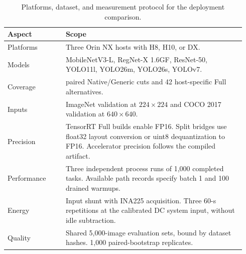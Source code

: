 \begin{table}[t]
\centering\small
\caption{Platforms, dataset, and measurement protocol for the deployment comparison.}
\label{tab:experimental-scope}
\setlength{\tabcolsep}{3pt}
\begin{tabular}{@{}>{\raggedright\arraybackslash}p{0.23\linewidth}>{\raggedright\arraybackslash}p{0.71\linewidth}@{}}
\toprule
Aspect & Scope \\
\midrule
Platforms & Three Orin NX hosts with H8, H10, or DX. \\
Models & MobileNetV3-L, RegNet-X 1.6GF, ResNet-50, YOLO11l, YOLO26m, YOLO26s, YOLOv7. \\
Coverage & 204 paired Native/Generic cuts and 42 host-specific Full alternatives. \\
Inputs & ImageNet validation at $224\times224$ and COCO 2017 validation at $640\times640$. \\
Precision & TensorRT Full builds enable FP16. Split bridges use float32 layout conversion or uint8 dequantization to FP16. Accelerator precision follows the compiled artifact. \\
Performance & Three independent process runs of 1,000 completed tasks. Available path records specify batch 1 and 100 drained warmups. \\
Energy & Input shunt with INA225 acquisition. Three 60-s repetitions at the calibrated DC system input, without idle subtraction. \\
Quality & Shared 5,000-image evaluation sets, bound by dataset hashes. 1,000 paired-bootstrap replicates. \\
\bottomrule
\end{tabular}
\end{table}
